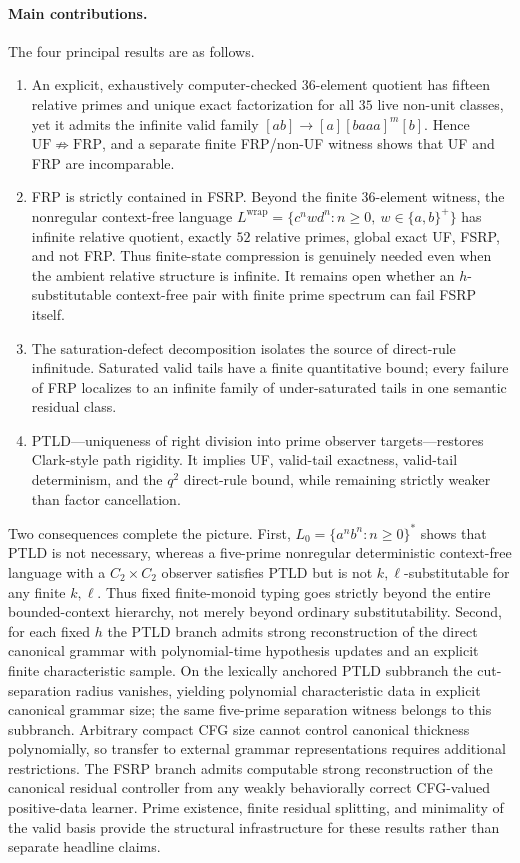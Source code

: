 \documentclass[11pt,a4paper]{article}
\begin{document}
\paragraph{Main contributions.}
The four principal results are as follows.
\begin{enumerate}[leftmargin=2.2em]
\item An explicit, exhaustively computer-checked $36$-element quotient has fifteen relative primes and unique exact factorization for all $35$ live non-unit classes, yet it admits the infinite valid family $[ab]\to[a][baaa]^m[b]$.  Hence $\mathrm{UF}\not\Rightarrow\mathrm{FRP}$, and a separate finite FRP/non-UF witness shows that UF and FRP are incomparable.
\item FRP is strictly contained in FSRP.  Beyond the finite $36$-element witness, the nonregular context-free language $L^{\mathrm{wrap}}=\{c^nwd^n:n\ge0,\ w\in\{a,b\}^+\}$ has infinite relative quotient, exactly $52$ relative primes, global exact UF, FSRP, and not FRP.  Thus finite-state compression is genuinely needed even when the ambient relative structure is infinite.  It remains open whether an $h$-substitutable context-free pair with finite prime spectrum can fail FSRP itself.
\item The saturation-defect decomposition isolates the source of direct-rule infinitude.  Saturated valid tails have a finite quantitative bound; every failure of FRP localizes to an infinite family of under-saturated tails in one semantic residual class.
\item PTLD---uniqueness of right division into prime observer targets---restores Clark-style path rigidity.  It implies UF, valid-tail exactness, valid-tail determinism, and the $q^2$ direct-rule bound, while remaining strictly weaker than factor cancellation.
\end{enumerate}

Two consequences complete the picture.  First, $L_0=\{a^nb^n:n\ge0\}^*$ shows that PTLD is not necessary, whereas a five-prime nonregular deterministic context-free language with a $C_2\times C_2$ observer satisfies PTLD but is not $k,\ell$-substitutable for any finite $k,\ell$.  Thus fixed finite-monoid typing goes strictly beyond the entire bounded-context hierarchy, not merely beyond ordinary substitutability.  Second, for each fixed $h$ the PTLD branch admits strong reconstruction of the direct canonical grammar with polynomial-time hypothesis updates and an explicit finite characteristic sample.  On the lexically anchored PTLD subbranch the cut-separation radius vanishes, yielding polynomial characteristic data in explicit canonical grammar size; the same five-prime separation witness belongs to this subbranch.  Arbitrary compact CFG size cannot control canonical thickness polynomially, so transfer to external grammar representations requires additional restrictions.  The FSRP branch admits computable strong reconstruction of the canonical residual controller from any weakly behaviorally correct CFG-valued positive-data learner.  Prime existence, finite residual splitting, and minimality of the valid basis provide the structural infrastructure for these results rather than separate headline claims.
\end{document}
